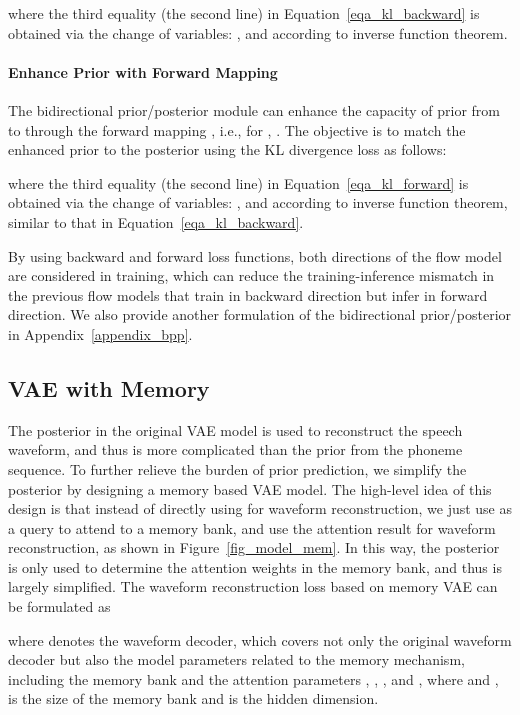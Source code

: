 \documentclass{article}
\theoremstyle{definition}
\begin{document}
where the third equality (the second line) in Equation~\ref{eqa_kl_backward} is obtained via the change of variables: , and  according to inverse function theorem.


\paragraph{Enhance Prior  with Forward Mapping }
The bidirectional prior/posterior module can enhance the capacity of prior from  to  through the forward mapping , i.e., for , . The objective is to match the enhanced prior  to the posterior  using the KL divergence loss as follows:

where the third equality (the second line) in Equation~\ref{eqa_kl_forward} is obtained via the change of variables: , and  according to inverse function theorem, similar to that in Equation~\ref{eqa_kl_backward}. 

By using backward and forward loss functions, both directions of the flow model are considered in training, which can reduce the training-inference mismatch in the previous flow models that train in backward direction but infer in forward direction. We also provide another formulation of the bidirectional prior/posterior in Appendix~\ref{appendix_bpp}.

\subsection{VAE with Memory}
\label{sec_memory_vae}

The posterior  in the original VAE model is used to reconstruct the speech waveform, and thus is more complicated than the prior from the phoneme sequence. To further relieve the burden of prior prediction, we simplify the posterior by designing a memory based VAE model. The high-level idea of this design is that instead of directly using  for waveform reconstruction, we just use  as a query to attend to a memory bank, and use the attention result for waveform reconstruction, as shown in Figure~\ref{fig_model_mem}. In this way, the posterior  is only used to determine the attention weights in the memory bank, and thus is largely simplified. The waveform reconstruction loss based on memory VAE can be formulated as 

where  denotes the waveform decoder, which covers not only the original waveform decoder but also the model parameters related to the memory mechanism, including the memory bank  and the attention parameters , , , and , where  and ,  is the size of the memory bank and  is the hidden dimension. 
\end{document}
